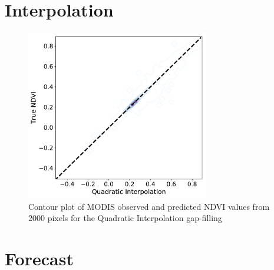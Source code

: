\documentclass[review]{elsarticle}
\begin{document}
\newpage
\section{Interpolation}
\begin{figure} 
	\centering
	\includegraphics[trim = 30mm 5mm 5mm 15mm,width=8cm]{figures/QuadraticInt_contour.pdf} 
	\caption{Contour plot of MODIS observed and predicted NDVI values from 2000 pixels for the Quadratic Interpolation gap-filling} \label{fig:interpScatter}
\end{figure}






\newpage

\section{Forecast}
\end{document}

